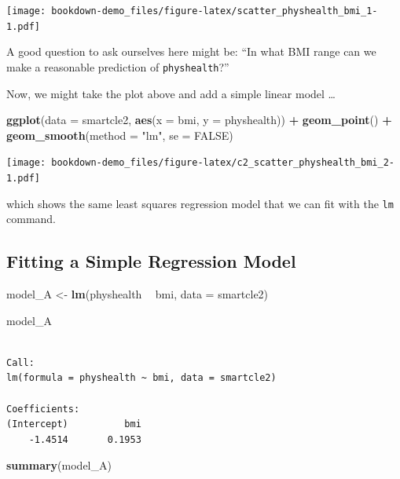 \documentclass[]{book}
\newenvironment{Shaded}{\begin{snugshade}}{\end{snugshade}}
\newcommand{\KeywordTok}[1]{\textcolor[rgb]{0.13,0.29,0.53}{\textbf{#1}}}
\newcommand{\DataTypeTok}[1]{\textcolor[rgb]{0.13,0.29,0.53}{#1}}
\newcommand{\StringTok}[1]{\textcolor[rgb]{0.31,0.60,0.02}{#1}}
\newcommand{\OtherTok}[1]{\textcolor[rgb]{0.56,0.35,0.01}{#1}}
\newcommand{\OperatorTok}[1]{\textcolor[rgb]{0.81,0.36,0.00}{\textbf{#1}}}
\newcommand{\NormalTok}[1]{#1}
\theoremstyle{definition}
\theoremstyle{definition}
\theoremstyle{definition}
\theoremstyle{remark}
\begin{document}
\texttt{[image: bookdown-demo\_files/figure-latex/scatter\_physhealth\_bmi\_1-1.pdf]}

A good question to ask ourselves here might be: ``In what BMI range can
we make a reasonable prediction of \texttt{physhealth}?''

Now, we might take the plot above and add a simple linear model \ldots{}

\begin{Shaded}
\begin{Highlighting}[]
\KeywordTok{ggplot}\NormalTok{(}\DataTypeTok{data =}\NormalTok{ smartcle2, }\KeywordTok{aes}\NormalTok{(}\DataTypeTok{x =}\NormalTok{ bmi, }\DataTypeTok{y =}\NormalTok{ physhealth)) }\OperatorTok{+}
\StringTok{    }\KeywordTok{geom_point}\NormalTok{() }\OperatorTok{+}
\StringTok{    }\KeywordTok{geom_smooth}\NormalTok{(}\DataTypeTok{method =} \StringTok{"lm"}\NormalTok{, }\DataTypeTok{se =} \OtherTok{FALSE}\NormalTok{)}
\end{Highlighting}
\end{Shaded}

\texttt{[image: bookdown-demo\_files/figure-latex/c2\_scatter\_physhealth\_bmi\_2-1.pdf]}

which shows the same least squares regression model that we can fit with
the \texttt{lm} command.

\subsection{Fitting a Simple Regression
Model}\label{fitting-a-simple-regression-model}

\begin{Shaded}
\begin{Highlighting}[]
\NormalTok{model_A <-}\StringTok{ }\KeywordTok{lm}\NormalTok{(physhealth }\OperatorTok{~}\StringTok{ }\NormalTok{bmi, }\DataTypeTok{data =}\NormalTok{ smartcle2)}

\NormalTok{model_A}
\end{Highlighting}
\end{Shaded}

\begin{verbatim}

Call:
lm(formula = physhealth ~ bmi, data = smartcle2)

Coefficients:
(Intercept)          bmi  
    -1.4514       0.1953  
\end{verbatim}

\begin{Shaded}
\begin{Highlighting}[]
\KeywordTok{summary}\NormalTok{(model_A)}
\end{Highlighting}
\end{Shaded}
\end{document}
